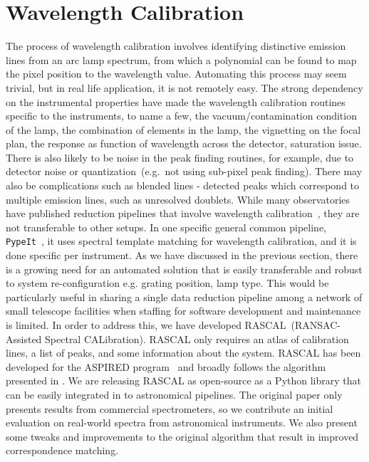 \documentclass{aa}
\begin{document}
\section{Wavelength Calibration}
The process of wavelength calibration involves identifying distinctive emission lines
from an arc lamp spectrum, from which a polynomial can be found to map the pixel
position to the wavelength value. Automating this process may seem trivial, but in
real life application, it is not remotely easy. The strong dependency on the 
instrumental properties have made the wavelength calibration routines specific to
the instruments, to name a few, the vacuum/contamination condition of the lamp, the 
combination of elements in the lamp, the vignetting on the focal plan, the response
as function of wavelength across the detector, saturation issue. There is also likely
to be noise in the peak finding routines, for example, due to detector noise or
quantization~(e.g.\ not using sub-pixel peak finding). There may also be complications
such as blended lines - detected peaks which correspond to multiple emission lines,
such as unresolved doublets. While many observatories have published reduction
pipelines that involve wavelength calibration~\citep{2002AJ....123..485S,
2012ascl.soft03003C, 2013ApJS..208....5N}, they are not transferable to other setups.
In one specific general common pipeline, \texttt{PypeIt}~\citep{2020JOSS....5.2308P},
it uses spectral template matching for wavelength calibration, and it is done specific
per instrument. As we have discussed in the previous section, there is a growing need
for an automated solution that is easily transferable and robust to system 
re-configuration e.g. grating position, lamp type. This would be particularly
useful in sharing a single data reduction pipeline among a network of small telescope
facilities when staffing for software development and maintenance is limited.
In order to address this, we have developed RASCAL~(RANSAC-Assisted Spectral CALibration).
RASCAL only requires an atlas of calibration lines, a list of peaks, and some information
about the system. RASCAL has been developed for the ASPIRED
program~\citep{2019arXiv191205885L, 2020arXiv201203505L, 2020zndo...4306065L}
and broadly follows the algorithm presented in \citet{2018ApOpt..57.6876S}. We are
releasing RASCAL as open-source as a Python library that can be easily integrated in to
astronomical pipelines. The original paper only presents results from commercial
spectrometers, so we contribute an initial evaluation on real-world spectra
from astronomical instruments. We also present some tweaks and improvements to the
original algorithm that result in improved correspondence matching.
\end{document}
